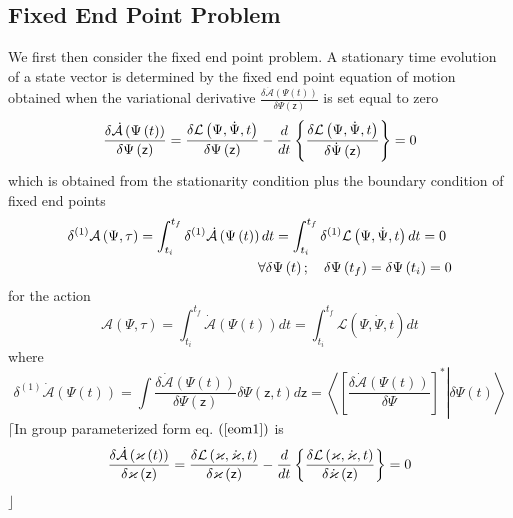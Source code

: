 \documentclass[aps,preprint]{revtex4}
\begin{document}
\subsection{Fixed End Point Problem}

We first then consider the fixed end point problem. A stationary time
evolution of a state vector is determined by the fixed end point equation of
motion obtained when the variational derivative $\frac{\delta \mathcal{\dot{A%
}}\left( \Psi \left( t\right) \right) }{\delta \Psi \left( \mathsf{z}\right) 
}$ is set equal to zero 
\begin{equation}
\frac{\delta \mathcal{\dot{A}}\left( \Psi \left( t\right) \right) }{\delta
\Psi \left( \mathsf{z}\right) }=\frac{\delta \mathcal{L}\left( \Psi ,\dot{%
\Psi},t\right) }{\delta \Psi \left( \mathsf{z}\right) }-\frac{d}{dt}\left\{ 
\frac{\delta \mathcal{L}\left( \Psi ,\dot{\Psi},t\right) }{\delta \dot{\Psi}%
\left( \mathsf{z}\right) }\right\} =0  \label{eom1}
\end{equation}%
which is obtained from the stationarity condition plus the boundary
condition of fixed end points 
\begin{align}
\delta ^{\left( 1\right) }\mathcal{A}\left( \Psi ,\tau \right) &
=\int_{t_{i}}^{t_{f}}\delta ^{\left( 1\right) }\mathcal{\dot{A}}\left( \Psi
\left( t\right) \right) dt=\int_{t_{i}}^{t_{f}}\delta ^{\left( 1\right) }%
\mathcal{L}\left( \Psi ,\dot{\Psi},t\right) dt=0  \notag \\
& \left. {}\right. \qquad \qquad \qquad \qquad \forall \delta \Psi \left(
t\right) ;\quad \delta \Psi \left( t_{f}\right) =\delta \Psi \left(
t_{i}\right) =0
\end{align}%
for the action%
\begin{equation}
\mathcal{A}\left( \Psi ,\tau \right) =\int_{t_{i}}^{t_{f}}\mathcal{\dot{A}}%
\left( \Psi \left( t\right) \right) dt=\int_{t_{i}}^{t_{f}}\mathcal{L}\left(
\Psi ,\dot{\Psi},t\right) dt
\end{equation}%
where 
\begin{equation}
\delta ^{\left( 1\right) }\mathcal{\dot{A}}\left( \Psi \left( t\right)
\right) =\int \frac{\delta \mathcal{\dot{A}}\left( \Psi \left( t\right)
\right) }{\delta \Psi \left( \mathsf{z}\right) }\delta \Psi \left( \mathsf{z,%
}t\right) d\mathsf{z}=\left\langle \left. \left[ \frac{\delta \mathcal{\dot{A%
}}\left( \Psi \left( t\right) \right) }{\delta \Psi }\right] ^{\ast
}\right\vert \delta \Psi \left( t\right) \right\rangle
\end{equation}%
$\lceil $In group parameterized form eq. $\left( \ref{eom1}\right) $ is 
\begin{equation}
\frac{\delta \mathcal{\dot{A}}\left( \varkappa \left( t\right) \right) }{%
\delta \varkappa \left( \mathsf{z}\right) }=\frac{\delta \mathcal{L}\left( 
\mathcal{\varkappa },\mathcal{\dot{\varkappa}},t\right) }{\delta \mathcal{%
\varkappa }\left( \mathsf{z}\right) }-\frac{d}{dt}\left\{ \frac{\delta 
\mathcal{L}\left( \mathcal{\varkappa },\mathcal{\dot{\varkappa}},t\right) }{%
\delta \mathcal{\dot{\varkappa}}\left( \mathsf{z}\right) }\right\} =0
\label{eom2}
\end{equation}%
$\rfloor $
\end{document}
